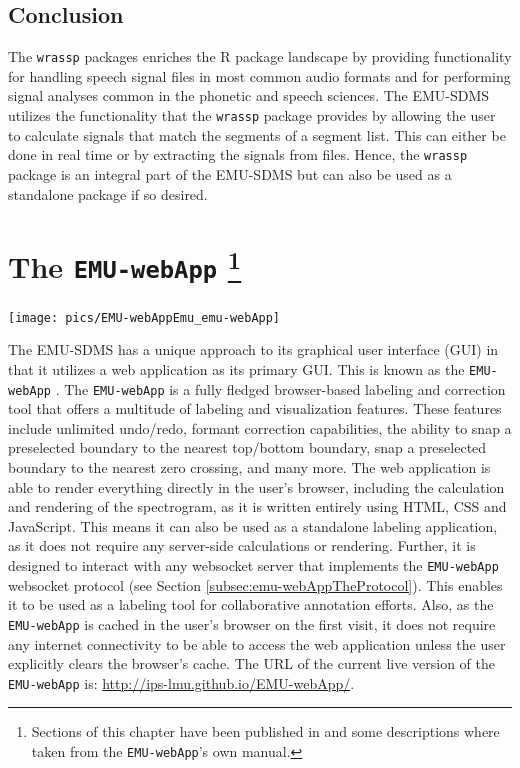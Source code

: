 \documentclass[]{book}
\begin{document}
\hypertarget{conclusion-4}{%
\section{Conclusion}\label{conclusion-4}}

The \texttt{wrassp} packages enriches the R package landscape by providing functionality for handling speech signal files in most common audio formats and for performing signal analyses common in the phonetic and speech sciences. The EMU-SDMS utilizes the functionality that the \texttt{wrassp} package provides by allowing the user to calculate signals that match the segments of a segment list. This can either be done in real time or by extracting the signals from files. Hence, the \texttt{wrassp} package is an integral part of the EMU-SDMS but can also be used as a standalone package if so desired.

\hypertarget{chap:emu-webApp}{%
\chapter[The \texttt{EMU-webApp} ]{\texorpdfstring{The \texttt{EMU-webApp} \footnote{Sections of this chapter have been published in \citep{winkelmann:2015d} and some descriptions where taken from the \texttt{EMU-webApp}'s own manual.}}{The EMU-webApp }}\label{chap:emu-webApp}}

\begin{center}\texttt{[image: pics/EMU-webAppEmu\_emu-webApp]} \end{center}

The EMU-SDMS has a unique approach to its graphical user interface (GUI) in that it utilizes a web application as its primary GUI. This is known as the \texttt{EMU-webApp} \citep{winkelmann:2015d}. The \texttt{EMU-webApp} is a fully fledged browser-based labeling and correction tool that offers a multitude of labeling and visualization features. These features include unlimited undo/redo, formant correction capabilities, the ability to snap a preselected boundary to the nearest top/bottom boundary, snap a preselected boundary to the nearest zero crossing, and many more. The web application is able to render everything directly in the user's browser, including the calculation and rendering of the spectrogram, as it is written entirely using HTML, CSS and JavaScript. This means it can also be used as a standalone labeling application, as it does not require any server-side calculations or rendering. Further, it is designed to interact with any websocket server that implements the \texttt{EMU-webApp} websocket protocol (see Section \ref{subsec:emu-webAppTheProtocol}). This enables it to be used as a labeling tool for collaborative annotation efforts. Also, as the \texttt{EMU-webApp} is cached in the user's browser on the first visit, it does not require any internet connectivity to be able to access the web application unless the user explicitly clears the browser's cache. The URL of the current live version of the \texttt{EMU-webApp} is: \url{http://ips-lmu.github.io/EMU-webApp/}.
\end{document}
